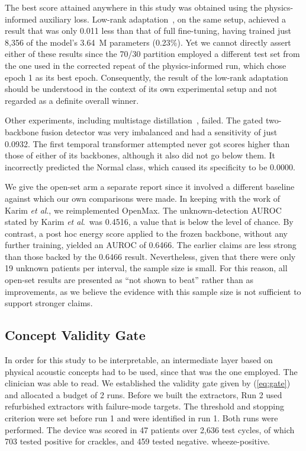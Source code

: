 \documentclass[journal,onecolumn]{IEEEtran}
\begin{document}
The best score attained anywhere in this study was obtained using the physics-informed auxiliary loss. Low-rank adaptation~\cite{hu2022lora}, on the same setup, achieved a result that was only 0.011 less than that of full fine-tuning, having trained just 8,356 of the model's 3.64~M parameters (0.23\%). Yet we cannot directly assert either of these results since the 70/30 partition employed a different test set from the one used in the corrected repeat of the physics-informed run, which chose epoch 1 as its best epoch. Consequently, the result of the low-rank adaptation should be understood in the context of its own experimental setup and not regarded as a definite overall winner.

Other experiments, including multistage distillation~\cite{pavel2024kd}, failed. The gated two-backbone fusion detector was very imbalanced and had a sensitivity of just 0.0932. The first temporal transformer attempted never got scores higher than those of either of its backbones, although it also did not go below them. It incorrectly predicted the Normal class, which caused its specificity to be 0.0000.

We give the open-set arm a separate report since it involved a different baseline against which our own comparisons were made. In keeping with the work of Karim \emph{et al}.\cite{karim2024mosquito}, we reimplemented OpenMax. The unknown-detection AUROC stated by Karim \emph{et al}.\ was 0.4516, a value that is below the level of chance. By contrast, a post hoc energy score applied to the frozen backbone, without any further training, yielded an AUROC of 0.6466. The earlier claims are less strong than those backed by the 0.6466 result. Nevertheless, given that there were only 19 unknown patients per interval, the sample size is small. For this reason, all open-set results are presented as ``not shown to beat'' rather than as improvements, as we believe the evidence with this sample size is not sufficient to support stronger claims.
\subsection{Concept Validity Gate}

\label{subsec:gate}In order for this study to be interpretable, an intermediate layer based on physical acoustic concepts had to be used, since that was the one employed. The clinician was able to read. We established the validity gate given by (\ref{eq:gate}) and allocated a budget of 2 runs. Before we built the extractors, Run 2 used refurbished extractors with failure-mode targets. The threshold and stopping criterion were set before run 1 and were identified in run 1. Both runs were performed. The device was scored in 47 patients over 2,636 test cycles, of which 703 tested positive for crackles, and 459 tested negative. wheeze-positive.
\end{document}

